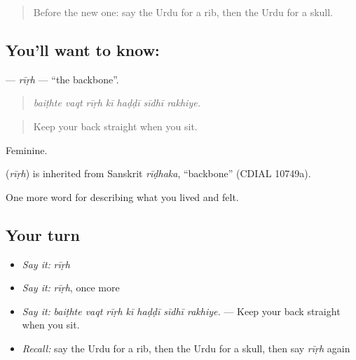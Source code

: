 \label{lesson:UR-C465-rirh}



\begin{quote}
Before the new one: say the Urdu for a rib, then the Urdu for a skull.
\end{quote}

\subsection*{You'll want to know: }
\textbf{} — \emph{rīṛh} — \textquotedblleft{}the backbone\textquotedblright{}.

\begin{quote}
      
\end{quote}

\begin{quote}
\emph{baiṭhte vaqt rīṛh kī haḍḍī sīdhī rakhiye.}
\end{quote}

\begin{quote}
Keep your back straight when you sit.
\end{quote}

Feminine.

\begin{cousinweb}
\textbf{} (\emph{rīṛh}) is inherited from Sanskrit \emph{rīḍhaka}, \textquotedblleft{}backbone\textquotedblright{} (CDIAL 10749a).
\end{cousinweb}

\begin{grammarlens}[title={What you've built}]
One more word for describing what you lived and felt.
\end{grammarlens}

\subsection*{Your turn}
\begin{itemize}
\raggedright
  \item \emph{Say it:} \emph{rīṛh}
  \item \emph{Say it:} \emph{rīṛh}, once more
  \item \emph{Say it:} \emph{baiṭhte vaqt rīṛh kī haḍḍī sīdhī rakhiye.} — Keep your back straight when you sit.
  \item \emph{Recall:} say the Urdu for a rib, then the Urdu for a skull, then say \emph{rīṛh} again
\end{itemize}

